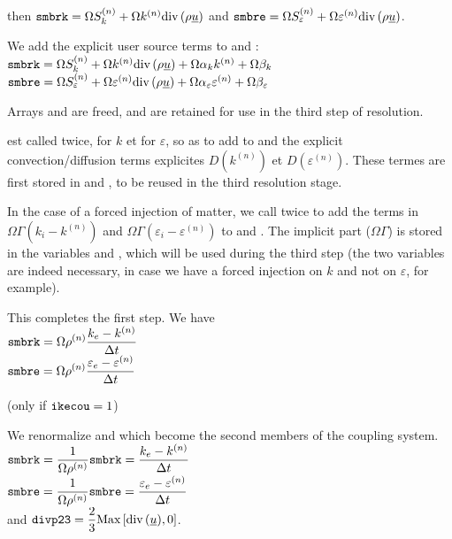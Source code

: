 then $\text{\texttt{smbrk}}=\Omega S_k^{(n)}+\Omega k^{(n)}\text{div}\,(\rho\underline{u})$
and $\text{\texttt{smbre}}=\Omega S_\varepsilon^{(n)}+\Omega\varepsilon^{(n)}\text{div}\,(\rho\underline{u})$.


We add the explicit user source terms to  and
:\\
$\text{\texttt{smbrk}}=\Omega S_k^{(n)}+\Omega k^{(n)}\text{div}\,(\rho\underline{u})+\Omega\alpha_k k^{(n)} +\Omega\beta_k$\\
$\text{\texttt{smbre}}=\Omega S_\varepsilon^{(n)}+\Omega\varepsilon^{(n)}\text{div}\,(\rho\underline{u})
+\Omega\alpha_\varepsilon \varepsilon^{(n)} +\Omega\beta_\varepsilon$

Arrays  and  are freed,  and  are
retained for use in the third step of resolution.

 est called twice, for $k$ et for $\varepsilon$, so
as to add to  and  the explicit convection/diffusion terms
explicites $D(k^{(n)})$ et $D(\varepsilon^{(n)})$. These termes are first
stored in  and , to be reused in the third resolution stage.

In the case of a forced injection of matter, we call 
twice to add the terms in
$\Omega \Gamma (k_i-k^{(n)})$ and
$\Omega \Gamma (\varepsilon_i-\varepsilon^{(n)})$ to  and
. The implicit part ($\Omega\Gamma$) is stored in the
variables  and , which will be used during the third
step (the two variables are indeed necessary, in case we have a
forced injection on $k$ and not on $\varepsilon$, for example).

This completes the first step. We have\\
$\displaystyle \text{\texttt{smbrk}}=\Omega \rho^{(n)}\frac{k_e-k^{(n)}}{\Delta t}$\\
$\displaystyle \text{\texttt{smbre}}=\Omega \rho^{(n)}\frac{\varepsilon_e-\varepsilon^{(n)}}{\Delta t}$

(only if $\text{\texttt{ikecou}}=1$)

We renormalize  and  which become the second members of the
coupling system.\\
$\displaystyle \text{\texttt{smbrk}}=\frac{1}{\Omega\rho^{(n)}}\text{\texttt{smbrk}}
=\frac{k_e-k^{(n)}}{\Delta t}$\\
$\displaystyle \text{\texttt{smbre}}=\frac{1}{\Omega\rho^{(n)}}\text{\texttt{smbre}}
=\frac{\varepsilon_e-\varepsilon^{(n)}}{\Delta t}$\\
and $\displaystyle \text{\texttt{divp23}}=\frac{2}{3}\text{Max}\left[\text{div}\,(\underline{u}),0\right]$.

